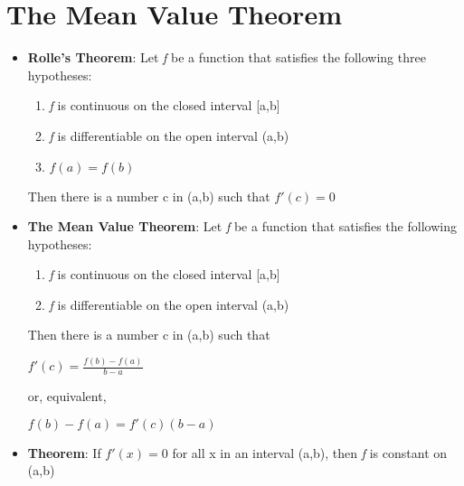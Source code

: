 \documentclass{report}
\begin{document}
		\section{The Mean Value Theorem}
			\begin{itemize}\addtolength{\leftskip}{2em}
				\item \textbf{Rolle's Theorem}: Let \textit{f} be a function that satisfies the following three hypotheses: 
				\begin{enumerate}\addtolength{\leftskip}{4em}
				\item \textit{f} is continuous on the closed interval [a,b]
				\item \textit{f} is differentiable on the open interval (a,b)
				\item $f(a)=f(b)$
				\end{enumerate}
				Then there is a number c in (a,b) such that $f'(c)=0$
				\item \textbf{The Mean Value Theorem}: Let \textit{f} be a function that satisfies the following hypotheses:
				\begin{enumerate}\addtolength{\leftskip}{4em}
				\item \textit{f} is continuous on the closed interval [a,b]
				\item \textit{f} is differentiable on the open interval (a,b)
				\end{enumerate}
				Then there is a number c in (a,b) such that 
				\begin{center}
				$f'(c)=\frac{f(b)-f(a)}{b-a}$
				\end{center}
				\begin{center}
				or, equivalent, 
				\end{center}
				\begin{center}
				$f(b)-f(a)=f'(c)(b-a)$
				\end{center}
				\item \textbf{Theorem}: If $f'(x)=0$ for all x in an interval (a,b), then \textit{f} is constant on (a,b)
			\end{itemize}
\end{document}
